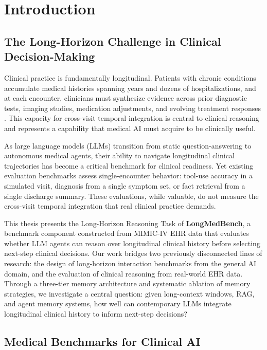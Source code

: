 \chapter{Introduction}

\section{The Long-Horizon Challenge in Clinical Decision-Making}

Clinical practice is fundamentally longitudinal. Patients with chronic conditions accumulate medical histories spanning years and dozens of hospitalizations, and at each encounter, clinicians must synthesize evidence across prior diagnostic tests, imaging studies, medication adjustments, and evolving treatment responses \cite{pmid41325597}. This capacity for cross-visit temporal integration is central to clinical reasoning and represents a capability that medical AI must acquire to be clinically useful.

As large language models (LLMs) transition from static question-answering to autonomous medical agents, their ability to navigate longitudinal clinical trajectories has become a critical benchmark for clinical readiness. Yet existing evaluation benchmarks assess single-encounter behavior: tool-use accuracy in a simulated visit, diagnosis from a single symptom set, or fact retrieval from a single discharge summary. These evaluations, while valuable, do not measure the cross-visit temporal integration that real clinical practice demands.

This thesis presents the Long-Horizon Reasoning Task of \textbf{LongMedBench}, a benchmark component constructed from MIMIC-IV \cite{PhysioNet-mimiciv-3.1} EHR data that evaluates whether LLM agents can reason over longitudinal clinical history before selecting next-step clinical decisions. Our work bridges two previously disconnected lines of research: the design of long-horizon interaction benchmarks from the general AI domain, and the evaluation of clinical reasoning from real-world EHR data. Through a three-tier memory architecture and systematic ablation of memory strategies, we investigate a central question: given long-context windows, RAG, and agent memory systems, how well can contemporary LLMs integrate longitudinal clinical history to inform next-step decisions?

\section{Medical Benchmarks for Clinical AI}

